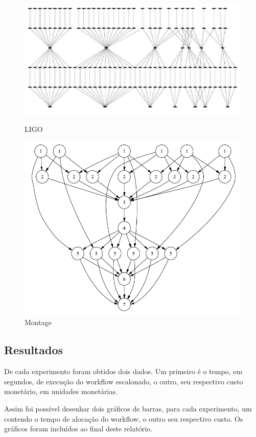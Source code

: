 \documentclass[a4paper,10pt]{article}
\begin{document}
\begin{figure}[!htb]
\includegraphics[scale=.25]{figures/ligo.png}
\caption{LIGO \protect\cite{bit}}
\label{ligo}

\includegraphics[scale=.25]{figures/montage.png}
\caption{Montage \protect\cite{bit}}
\label{montage}

\end{figure}

\subsection{Resultados}

De cada experimento foram obtidos dois dados. Um primeiro é o tempo, em segundos,
de execução do workflow escalonado, o outro, seu respectivo custo monetário, em 
unidades monetárias.

Assim foi possível desenhar dois gráficos de barras, para cada experimento, um
contendo o tempo de alocação do workflow, o outro seu respectivo custo. Os gráficos
foram incluídos ao final deste relatório.
\end{document}

